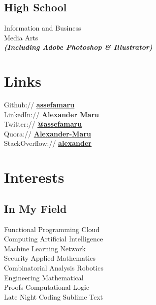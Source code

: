 \documentclass[letterpaper]{deedy-resume}
\begin{document}
\begin{minipage}[t]{0.33\textwidth}

\subsection{High School}

Information and Business \\
Media Arts \\
{\footnotesize \textit{\textbf{(Including Adobe Photoshop \& Illustrator) }}}

\sectionspace 




\section{Links} 

Github:// \href{https://github.com/assefamaru}{\bf assefamaru} \\
LinkedIn:// \href{https://goo.gl/B7Jwf1}{\bf Alexander Maru} \\
Twitter:// \href{https://twitter.com/assefamaru}{\bf @assefamaru} \\
Quora:// \href{https://www.quora.com/Alexander-Maru}{\bf Alexander-Maru} \\
StackOverflow:// \href{http://stackoverflow.com/users/4739247/alexander?tab=profile}{\bf alexander}

\sectionspace 

\sectionspace 



\section{Interests}

\subsection{In My Field}

Functional Programming \textbullet{} Cloud \\ Computing \textbullet{} Artificial Intelligence \\ \textbullet{} Machine Learning \textbullet{} Network\\ Security \textbullet{} Applied Mathematics\\ \textbullet{} Combinatorial Analysis \textbullet{} Robotics\\ \textbullet{} Engineering \textbullet{} Mathematical\\ Proofs \textbullet{} Computational Logic\\ \textbullet{} Late Night Coding \textbullet{} Sublime Text \\


\end{minipage}
\end{document}
